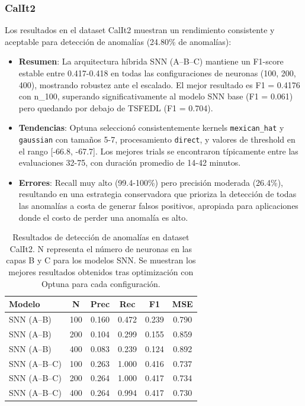 \subsubsection{CalIt2}
Los resultados en el dataset CalIt2 muestran un rendimiento consistente y aceptable para detección de anomalías (24.80\% de anomalías):
\begin{itemize}
    \item \textbf{Resumen}: La arquitectura híbrida SNN (A--B--C) mantiene un F1-score estable entre 0.417-0.418 en todas las configuraciones de neuronas (100, 200, 400), mostrando robustez ante el escalado. El mejor resultado es F1 = 0.4176 con n\_100, superando significativamente al modelo SNN base (F1 = 0.061) pero quedando por debajo de TSFEDL (F1 = 0.704).
    \item \textbf{Tendencias}: Optuna seleccionó consistentemente kernels \texttt{mexican\_hat} y \texttt{gaussian} con tamaños 5-7, procesamiento \texttt{direct}, y valores de threshold en el rango [-66.8, -67.7]. Los mejores trials se encontraron típicamente entre las evaluaciones 32-75, con duración promedio de 14-42 minutos.
    \item \textbf{Errores}: Recall muy alto (99.4-100\%) pero precisión moderada (26.4\%), resultando en una estrategia conservadora que prioriza la detección de todas las anomalías a costa de generar falsos positivos, apropiada para aplicaciones donde el costo de perder una anomalía es alto.
\end{itemize}

\begin{table}[htbp]
\centering
\small
\begin{tabular}{lccccc}
\hline\hline
\textbf{Modelo} & \textbf{N} & \textbf{Prec} & \textbf{Rec} & \textbf{F1} & \textbf{MSE} \\
\hline
SNN (A--B) & 100 & 0.160 & 0.472 & 0.239 & 0.790 \\
SNN (A--B) & 200 & 0.104 & 0.299 & 0.155 & 0.859 \\
SNN (A--B) & 400 & 0.083 & 0.239 & 0.124 & 0.892 \\
\hline
SNN (A--B--C) & 100 & 0.263 & 1.000 & 0.416 & 0.737 \\
SNN (A--B--C) & 200 & 0.264 & 1.000 & 0.417 & 0.734 \\
SNN (A--B--C) & 400 & 0.264 & 0.994 & 0.417 & 0.730 \\
\hline\hline
\end{tabular}
\caption{Resultados de detección de anomalías en dataset CalIt2. N representa el número de neuronas en las capas B y C para los modelos SNN. Se muestran los mejores resultados obtenidos tras optimización con Optuna para cada configuración.}
\label{tab:resultados-iops-escalabilidad}
\end{table}


